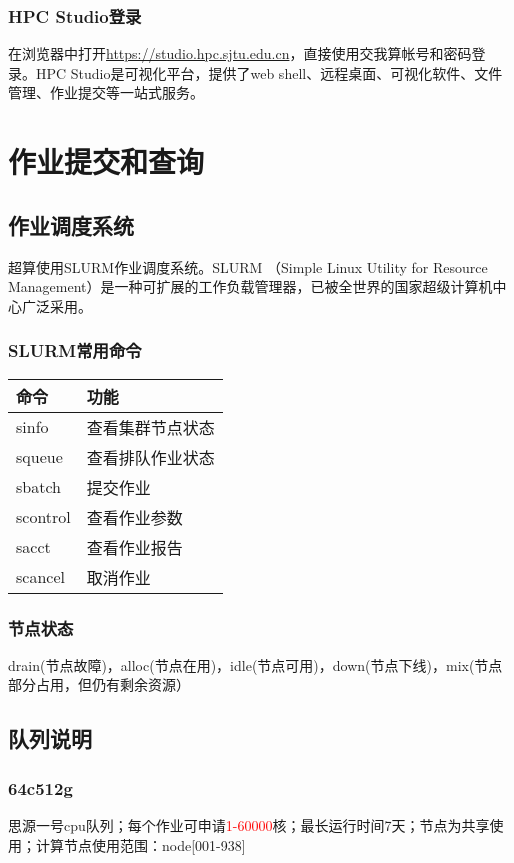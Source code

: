 \documentclass[cn, 12pt, hang, black, chinese]{elegantbook}
\begin{document}
\subsection*{HPC Studio登录}
在浏览器中打开\href{https://studio.hpc.sjtu.edu.cn}{https://studio.hpc.sjtu.edu.cn}，直接使用交我算帐号和密码登录。HPC Studio是可视化平台，提供了web shell、远程桌面、可视化软件、文件管理、作业提交等一站式服务。

\chapter{作业提交和查询}

\section{作业调度系统}
超算使用SLURM作业调度系统。SLURM （Simple Linux Utility for Resource Management）是一种可扩展的工作负载管理器，已被全世界的国家超级计算机中心广泛采用。

\subsection*{SLURM常用命令}

\begin{tabular}{ |l|l| }
 \hline
 命令 & 功能 \\
 \hline \hline
 sinfo & 查看集群节点状态 \\
 \hline
 squeue & 查看排队作业状态 \\
 \hline
 sbatch & 提交作业 \\
 \hline
 scontrol & 查看作业参数 \\
 \hline
 sacct & 查看作业报告 \\
 \hline
 scancel & 取消作业 \\
 \hline
\end{tabular}

\subsection*{节点状态}
drain(节点故障)，alloc(节点在用)，idle(节点可用)，down(节点下线)，mix(节点部分占用，但仍有剩余资源）

\section{队列说明}

\subsection*{64c512g}
思源一号cpu队列；每个作业可申请\textcolor{red}{1-60000}核；最长运行时间7天；节点为共享使用；计算节点使用范围：node[001-938]
\end{document}
